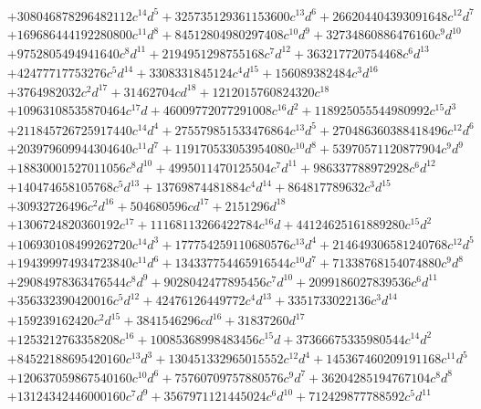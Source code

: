 {\begin{align*}
&+308046878296482112c^{14}d^{5}+325735129361153600c^{13}d^{6}+266204404393091648c^{12}d^{7}\\
&+169686444192280800c^{11}d^{8}+84512804980297408c^{10}d^{9}+32734860886476160c^{9}d^{10}\\
&+9752805494941640c^{8}d^{11}+2194951298755168c^{7}d^{12}+363217720754468c^{6}d^{13}\\
&+42477717753276c^{5}d^{14}+3308331845124c^{4}d^{15}+156089382484c^{3}d^{16}\\
&+3764982032c^{2}d^{17}+31462704cd^{18}+1212015760824320c^{18}\\
&+10963108535870464c^{17}d+46009772077291008c^{16}d^{2}+118925055544980992c^{15}d^{3}\\
&+211845726725917440c^{14}d^{4}+275579851533476864c^{13}d^{5}+270486360388418496c^{12}d^{6}\\
&+203979609944304640c^{11}d^{7}+119170533053954080c^{10}d^{8}+53970571120877904c^{9}d^{9}\\
&+18830001527011056c^{8}d^{10}+4995011470125504c^{7}d^{11}+986337788972928c^{6}d^{12}\\
&+140474658105768c^{5}d^{13}+13769874481884c^{4}d^{14}+864817789632c^{3}d^{15}\\
&+30932726496c^{2}d^{16}+504680596cd^{17}+2151296d^{18}\\
&+1306724820360192c^{17}+11168113266422784c^{16}d+44124625161889280c^{15}d^{2}\\
&+106930108499262720c^{14}d^{3}+177754259110680576c^{13}d^{4}+214649306581240768c^{12}d^{5}\\
&+194399974934723840c^{11}d^{6}+134337754465916544c^{10}d^{7}+71338768154074880c^{9}d^{8}\\
&+29084978363476544c^{8}d^{9}+9028042477895456c^{7}d^{10}+2099186027839536c^{6}d^{11}\\
&+356332390420016c^{5}d^{12}+42476126449772c^{4}d^{13}+3351733022136c^{3}d^{14}\\
&+159239162420c^{2}d^{15}+3841546296cd^{16}+31837260d^{17}\\
&+1253212763358208c^{16}+10085368998483456c^{15}d+37366675335980544c^{14}d^{2}\\
&+84522188695420160c^{13}d^{3}+130451332965015552c^{12}d^{4}+145367460209191168c^{11}d^{5}\\
&+120637059867540160c^{10}d^{6}+75760709757880576c^{9}d^{7}+36204285194767104c^{8}d^{8}\\
&+13124342446000160c^{7}d^{9}+3567971121445024c^{6}d^{10}+712429877788592c^{5}d^{11}\\

\end{align*}}
